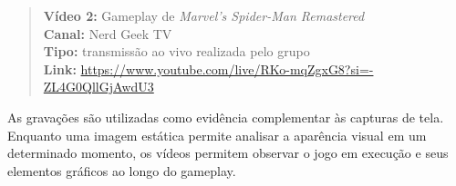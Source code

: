 \begin{quote}
\textbf{Vídeo 2:} Gameplay de \textit{Marvel's Spider-Man Remastered}\\
\textbf{Canal:} Nerd Geek TV\\
\textbf{Tipo:} transmissão ao vivo realizada pelo grupo\\
\textbf{Link:} \url{https://www.youtube.com/live/RKo-mqZgxG8?si=-ZL4G0QllGjAwdU3}
\end{quote}

As gravações são utilizadas como evidência complementar às capturas de tela.
Enquanto uma imagem estática permite analisar a aparência visual em um
determinado momento, os vídeos permitem observar o jogo em execução e seus
elementos gráficos ao longo do gameplay.